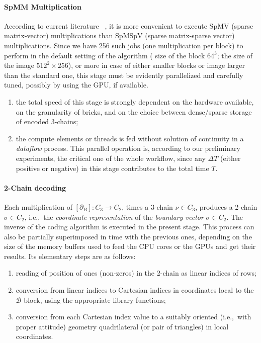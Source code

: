 \paragraph{SpMM Multiplication}\label{SpMM-multiplication}
According to current literature~
\cite{Buluc2017}, it is more convenient to execute SpMV (sparse matrix-vector) multiplications than SpMSpV (sparse matrix-sparse vector) multiplications. Since we have 256 such jobs (one multiplication per block) to perform in the default setting of the algorithm (
size of the block $64^3$; the size of the image $512^2\times 256$), or more in case of either smaller blocks or image larger than the standard one, this stage must be evidently parallelized and carefully tuned, possibly by using the GPU, if available.
\begin{enumerate}

\item the total speed of this stage is strongly dependent on the hardware available, on the granularity of bricks, and on the choice between dense/sparse storage of encoded 3-chains;

\item the compute elements or threads is fed without solution of continuity in a \emph{dataflow} process. This parallel operation is, according to our preliminary experiments, the critical one of the whole workflow, since any $\Delta T$ (either positive or negative) in this stage contributes to the total time $T$.

\end{enumerate}

\paragraph{2-Chain decoding}\label{sec:two-chain-decoding}
Each multiplication of $[\partial_B] : C_3 \to C_2$, times a 3-chain $\nu\in C_3$, produces a 2-chain  $\sigma\in C_2$, i.e.,~the \emph{coordinate representation} of the \emph{boundary vector} $\sigma\in C_2$.  The inverse of the coding algorithm is executed in the present stage.  This process can also be partially superimposed in time with the previous ones, depending on the size of the memory buffers used to feed the CPU cores or the GPUs and get their results. Its elementary steps are as follows:

\begin{enumerate}

\item reading of position of ones (non-zeros) in the 2-chain as linear indices of rows;

\item conversion from linear indices to Cartesian indices in coordinates local to the $\mathcal{B}$ block, using the appropriate library functions;

\item conversion from each Cartesian index value to a suitably oriented (i.e.,~with proper attitude) geometry quadrilateral (or pair of triangles) in local coordinates.

\end{enumerate}


